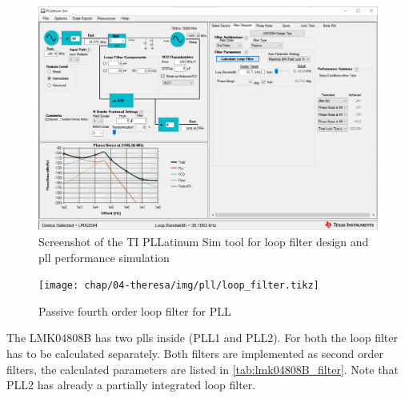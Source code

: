 \begin{figure}[tb]
	\centering
	\includegraphics[width = \textwidth]{chap/04-theresa/img/pll/pll.PNG}
	\caption[PLL block diagram]{Screenshot of the TI PLLatinum Sim tool for loop filter design and \gls{pll} performance simulation}
	\label{fig:ti_pll}
\end{figure}


\begin{figure}[tb]
	\centering
	\tikzexternaldisable
	\texttt{[image: chap/04-theresa/img/pll/loop\_filter.tikz]}
	\caption[PLL loop filter components]{Passive fourth order loop filter for PLL}
	\tikzexternalenable
	\label{fig:loop_filter}
\end{figure}

The LMK04808B has two \glspl{pll} inside (PLL1 and PLL2).
For both the loop filter has to be calculated separately. 
Both filters are implemented as second order filters, the calculated parameters are listed in \autoref{tab:lmk04808B_filter}.
Note that PLL2 has already a partially integrated loop filter.

